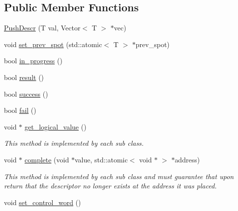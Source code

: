 \subsection*{Public Member Functions}
\begin{DoxyCompactItemize}
\item 
\hyperlink{classtervel_1_1containers_1_1wf_1_1vector_1_1_push_descr_af0089991c6b5ea3d30cac7a62129a553}{Push\+Descr} (T val, Vector$<$ T $>$ $\ast$vec)
\item 
void \hyperlink{classtervel_1_1containers_1_1wf_1_1vector_1_1_push_descr_a89ea642ab6bbe2f85027c20df8059308}{set\+\_\+prev\+\_\+spot} (std\+::atomic$<$ T $>$ $\ast$prev\+\_\+spot)
\item 
bool \hyperlink{classtervel_1_1containers_1_1wf_1_1vector_1_1_push_descr_a81fb90d94cb35aec8424b047011b31e3}{in\+\_\+progress} ()
\item 
bool \hyperlink{classtervel_1_1containers_1_1wf_1_1vector_1_1_push_descr_a8af9a44dc44815a8f844c47b4e7fde1f}{result} ()
\item 
bool \hyperlink{classtervel_1_1containers_1_1wf_1_1vector_1_1_push_descr_a618ee51ed91820baabce55f6f77bbf45}{success} ()
\item 
bool \hyperlink{classtervel_1_1containers_1_1wf_1_1vector_1_1_push_descr_aa136be2653a1d233e34016da44f13685}{fail} ()
\item 
void $\ast$ \hyperlink{classtervel_1_1containers_1_1wf_1_1vector_1_1_push_descr_ada1424d353cb887e5f6380f08d0e926a}{get\+\_\+logical\+\_\+value} ()
\begin{DoxyCompactList}\small\item\em This method is implemented by each sub class. \end{DoxyCompactList}\item 
void $\ast$ \hyperlink{classtervel_1_1containers_1_1wf_1_1vector_1_1_push_descr_aa8d94d395ac24a37566dfdde8616ff53}{complete} (void $\ast$value, std\+::atomic$<$ void $\ast$ $>$ $\ast$address)
\begin{DoxyCompactList}\small\item\em This method is implemented by each sub class and must guarantee that upon return that the descriptor no longer exists at the address it was placed. \end{DoxyCompactList}\item 
void \hyperlink{classtervel_1_1containers_1_1wf_1_1vector_1_1_push_descr_aecb481cfbf8b2f5d2a0dc603913bb237}{set\+\_\+control\+\_\+word} ()
\end{DoxyCompactItemize}
